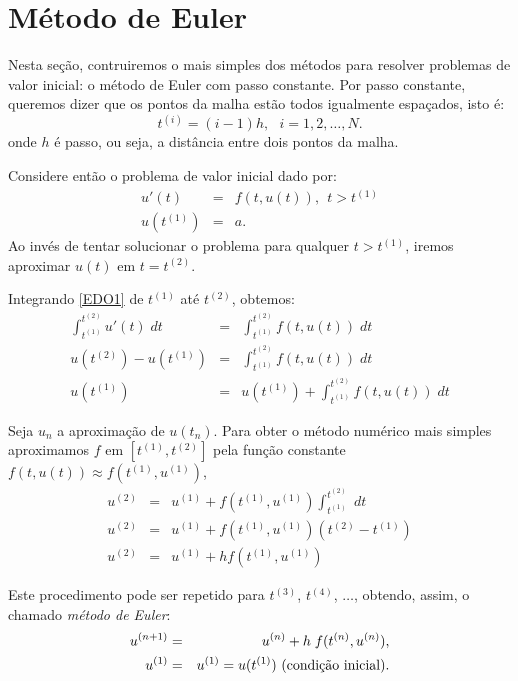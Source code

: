 \section{Método de Euler}\label{pvi:euler}
Nesta seção, contruiremos o mais simples dos métodos para resolver problemas de valor inicial: o método de Euler com passo constante. Por passo constante, queremos dizer que os pontos da malha estão todos igualmente espaçados, isto é:
$$t^{(i)}=(i-1)h,~~~i=1,2,\ldots,N.$$
onde $h$ é passo, ou seja, a distância entre dois pontos da malha.

Considere então o problema de valor inicial dado por:
\begin{eqnarray}\label{EDO1}
  u'(t)  &=& f(t,u(t)),~~t>t^{(1)} \\
  u(t^{(1)}) &=& a.
\end{eqnarray}
Ao invés de tentar solucionar o problema para qualquer $t>t^{(1)}$, iremos aproximar $u(t)$ em $t=t^{(2)}$.

Integrando \eqref{EDO1} de $t^{(1)}$ até $t^{(2)}$, obtemos:
\begin{eqnarray}
  \int_{t^{(1)}}^{t^{(2)}} u'(t) \;dt &=& \int_{t^{(1)}}^{t^{(2)}} f(t,u(t)) \; dt\\
  u(t^{(2)})-u(t^{(1)})               &=& \int_{t^{(1)}}^{t^{(2)}} f(t,u(t)) \; dt\\
  u(t^{(1)})                      &=& u(t^{(1)}) +  \int _{t^{(1)}}^{t^{(2)}} f(t,u(t)) \; dt
\end{eqnarray}

Seja $u_n$ a aproximação de $u(t_n)$. Para obter o método numérico mais simples aproximamos $f$ em $[t^{(1)},t^{(2)}]$ pela função constante $f(t,u(t)) \approx  f(t^{(1)},u^{(1)})$,
\begin{eqnarray}
  u^{(2)} &=&  u^{(1)} +   f(t^{(1)},u^{(1)}) \int _{t^{(1)}}^{t^{(2)}}  \; dt \\
  u^{(2)} &=&  u^{(1)} +   f(t^{(1)},u^{(1)}) (t^{(2)}-t^{(1)}) \\
  u^{(2)} &=&  u^{(1)} + h f(t^{(1)},u^{(1)})
\end{eqnarray}

Este procedimento pode ser repetido para  $t^{(3)}$, $t^{(4)}$, $\ldots$, obtendo, assim, o chamado \emph{método de Euler}:
\begin{eqnarray}\label{euler}
u^{(n+1)}&=&u^{(n)} + h\;f(t^{(n)},u^{(n)}),\\
u^{(1)}&=&u^{(1)}=u(t^{(1)})~ \hbox{(condição inicial)}.
\end{eqnarray}


